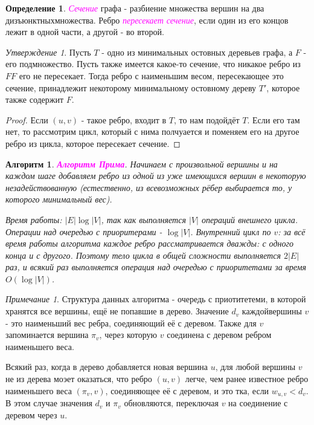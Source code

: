 \documentclass[a4paper]{article}
\theoremstyle{indented}
\newtheorem{alg}{Алгоритм}
\theoremstyle{definition}
\newtheorem{defn}{Определение}
\theoremstyle{remark}
\newtheorem{remark}{Примечание}
\newtheorem{stat}{Утверждение}
\begin{document}
\begin{defn}
    \textcolor{magenta}{\hypertarget{d5}{\textit{Сечение}}} графа - разбиение множества вершин на два дизъюнктныхмножества. Ребро \textcolor{magenta}{\hypertarget{d6}{\textit{пересекает сечение}}}, если один из его концов лежит в одной части, а другой - во второй. 
\end{defn}

\begin{stat}
    Пусть $T$ - одно из минимальных остовных деревьев графа, а $F$ - его подмножество. Пусть также имеется какое-то сечение, что никакое ребро из $FF$ его не пересекает. Тогда ребро с наименьшим весом, пересекающее это сечение, принадлежит некоторому минимальному остовному дереву $T'$, которое также содержит $F$. 
\end{stat}

\begin{proof}
    Если $(u, v)$ - такое ребро, входит в $T$, то нам подойдёт $T$. Если его там нет, то рассмотрим цикл, который с нима полчуается и поменяем его на другое ребро из цикла, которое пересекает сечение.
\end{proof}

\begin{alg}
    \textcolor{magenta}{\hypertarget{t18}{\textbf{Алгоритм Прима}}}. Начинаем с произвольной вершины и на каждом шаге добавляем ребро из одной из уже имеющихся вершин в некоторую незадействованную (естественно, из всевозможных рёбер выбирается то, у которого минимальный вес). \ 
    
    Время работы: $|E|\log |V|$, так как выполняется $|V|$ операций внешнего цикла. Операции над очередью с приоритерами - $\log|V|$. Внутренний цикл по $v$: за всё время работы алгоритма каждое ребро рассматривается дважды: с одного конца и с другого. Поэтому тело цикла в общей сложности выполняется $2|E|$ раз, и всякий раз выполняется операция над очередью с приоритетами за время $O(\log |V|)$. 
\end{alg}

\begin{remark}
    Структура данных алгоритма - очередь с приотитетеми, в которой хранятся все вершины, ещё не попавшие в дерево. Значение $d_v$ каждойвершины $v$ - это наименьший вес ребра, соединяющий её с деревом. Также для $v$ запоминается вершина $\pi_v$, через которую $v$ соединена с деревом ребром наименьшего веса. \ 

    Всякий раз, когда в дерево добавляется новая вершина $u$, для любой вершины $v$ не из дерева моэет оказаться, что ребро $(u, v)$ легче, чем ранее известное ребро наименьшего веса $(\pi_v, v)$, соединяющее её с деревом, и это тка, если $w_{u, v}<d_v$. В этом случае значения $d_v$ и $\pi_v$ обновляются, переключая $v$ на соединение с деревом через $u$. 
\end{remark}
\end{document}
